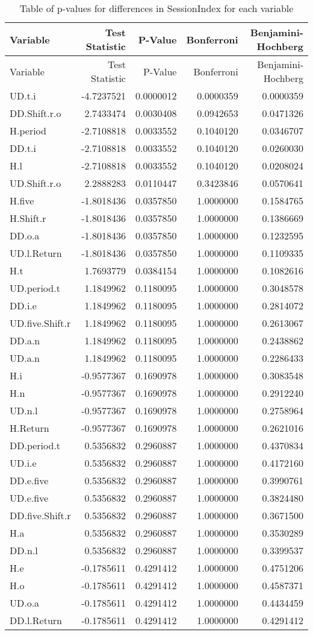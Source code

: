 \documentclass[]{article}
\begin{document}
\begin{longtable}[]{@{}lrrrr@{}}
\caption{Table of p-values for differences in SessionIndex for each
variable}\tabularnewline
\toprule
Variable & Test Statistic & P-Value & Bonferroni &
Benjamini-Hochberg\tabularnewline
\midrule
\endfirsthead
\toprule
Variable & Test Statistic & P-Value & Bonferroni &
Benjamini-Hochberg\tabularnewline
\midrule
\endhead
UD.t.i & -4.7237521 & 0.0000012 & 0.0000359 & 0.0000359\tabularnewline
DD.Shift.r.o & 2.7433474 & 0.0030408 & 0.0942653 &
0.0471326\tabularnewline
H.period & -2.7108818 & 0.0033552 & 0.1040120 & 0.0346707\tabularnewline
DD.t.i & -2.7108818 & 0.0033552 & 0.1040120 & 0.0260030\tabularnewline
H.l & -2.7108818 & 0.0033552 & 0.1040120 & 0.0208024\tabularnewline
UD.Shift.r.o & 2.2888283 & 0.0110447 & 0.3423846 &
0.0570641\tabularnewline
H.five & -1.8018436 & 0.0357850 & 1.0000000 & 0.1584765\tabularnewline
H.Shift.r & -1.8018436 & 0.0357850 & 1.0000000 &
0.1386669\tabularnewline
DD.o.a & -1.8018436 & 0.0357850 & 1.0000000 & 0.1232595\tabularnewline
UD.l.Return & -1.8018436 & 0.0357850 & 1.0000000 &
0.1109335\tabularnewline
H.t & 1.7693779 & 0.0384154 & 1.0000000 & 0.1082616\tabularnewline
UD.period.t & 1.1849962 & 0.1180095 & 1.0000000 &
0.3048578\tabularnewline
DD.i.e & 1.1849962 & 0.1180095 & 1.0000000 & 0.2814072\tabularnewline
UD.five.Shift.r & 1.1849962 & 0.1180095 & 1.0000000 &
0.2613067\tabularnewline
DD.a.n & 1.1849962 & 0.1180095 & 1.0000000 & 0.2438862\tabularnewline
UD.a.n & 1.1849962 & 0.1180095 & 1.0000000 & 0.2286433\tabularnewline
H.i & -0.9577367 & 0.1690978 & 1.0000000 & 0.3083548\tabularnewline
H.n & -0.9577367 & 0.1690978 & 1.0000000 & 0.2912240\tabularnewline
UD.n.l & -0.9577367 & 0.1690978 & 1.0000000 & 0.2758964\tabularnewline
H.Return & -0.9577367 & 0.1690978 & 1.0000000 & 0.2621016\tabularnewline
DD.period.t & 0.5356832 & 0.2960887 & 1.0000000 &
0.4370834\tabularnewline
UD.i.e & 0.5356832 & 0.2960887 & 1.0000000 & 0.4172160\tabularnewline
DD.e.five & 0.5356832 & 0.2960887 & 1.0000000 & 0.3990761\tabularnewline
UD.e.five & 0.5356832 & 0.2960887 & 1.0000000 & 0.3824480\tabularnewline
DD.five.Shift.r & 0.5356832 & 0.2960887 & 1.0000000 &
0.3671500\tabularnewline
H.a & 0.5356832 & 0.2960887 & 1.0000000 & 0.3530289\tabularnewline
DD.n.l & 0.5356832 & 0.2960887 & 1.0000000 & 0.3399537\tabularnewline
H.e & -0.1785611 & 0.4291412 & 1.0000000 & 0.4751206\tabularnewline
H.o & -0.1785611 & 0.4291412 & 1.0000000 & 0.4587371\tabularnewline
UD.o.a & -0.1785611 & 0.4291412 & 1.0000000 & 0.4434459\tabularnewline
DD.l.Return & -0.1785611 & 0.4291412 & 1.0000000 &
0.4291412\tabularnewline
\bottomrule
\end{longtable}
\end{document}
